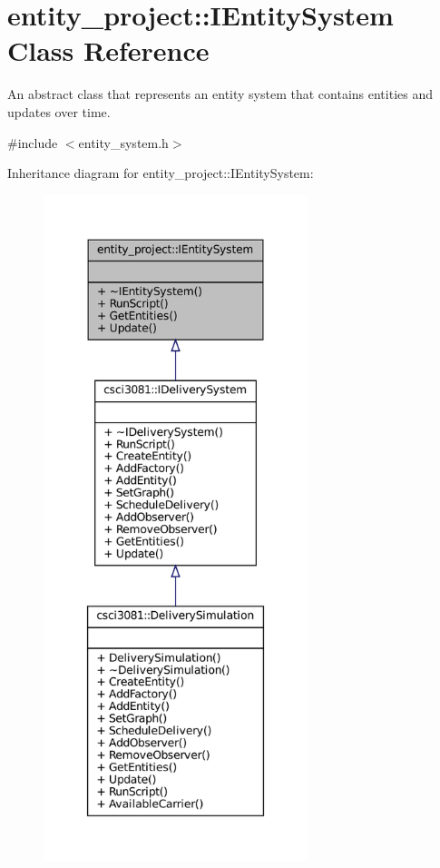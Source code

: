 \hypertarget{classentity__project_1_1IEntitySystem}{}\section{entity\+\_\+project\+:\+:I\+Entity\+System Class Reference}
\label{classentity__project_1_1IEntitySystem}


An abstract class that represents an entity system that contains entities and updates over time.  




{\ttfamily \#include $<$entity\+\_\+system.\+h$>$}



Inheritance diagram for entity\+\_\+project\+:\+:I\+Entity\+System\+:
\nopagebreak
\begin{figure}[H]
\begin{center}
\leavevmode
\includegraphics[height=550pt]{classentity__project_1_1IEntitySystem__inherit__graph}
\end{center}
\end{figure}
